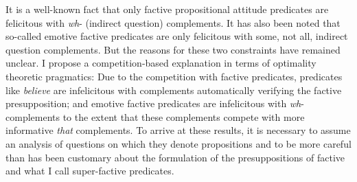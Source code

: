 It is a well-known fact that only factive propositional attitude predicates are felicitous with \textit{wh}- (indirect question) complements. It has also been noted that so-called emotive factive predicates are only felicitous with some, not all, indirect question complements. But the reasons for these two constraints have remained unclear. I propose a competition-based explanation in terms of optimality theoretic pragmatics: Due to the competition with factive predicates, predicates like \textit{believe} are infelicitous with complements automatically verifying the factive presupposition; and emotive factive predicates are infelicitous with \textit{wh}- complements to the extent that these complements compete with more informative \textit{that} complements. To arrive at these results, it is necessary to assume an analysis of questions on which they denote propositions and to be more careful than has been customary about the formulation of the presuppositions of factive and what I call super-factive predicates.
\endinput